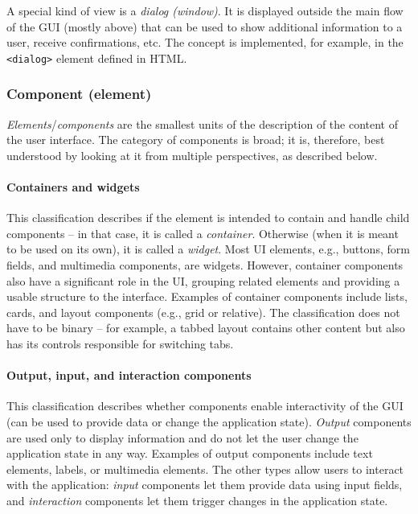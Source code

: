 A special kind of view is a \emph{dialog (window)}.
It is displayed outside the main flow of the GUI (mostly above) that can be used to show additional information to a user, receive confirmations, etc.
The concept is implemented, for example, in the \texttt{<dialog>} element defined in HTML.

\subsubsection{Component (element)}
\emph{Elements}/\emph{components} are the smallest units of the description of the content of the user interface.
The category of components is broad;
it is, therefore, best understood by looking at it from multiple perspectives, as described below.

\paragraph{Containers and widgets}
This classification describes if the element is intended to contain and handle child components -- in that case, it is called a \emph{container}.
Otherwise (when it is meant to be used on its own), it is called a \emph{widget}.
Most UI elements, e.g., buttons, form fields, and multimedia components, are widgets.
However, container components also have a significant role in the UI, grouping related elements and providing a usable structure to the interface.
Examples of container components include lists, cards, and layout components (e.g., grid or relative).
The classification does not have to be binary -- for example, a tabbed layout contains other content but also has its controls responsible for switching tabs.

\paragraph{Output, input, and interaction components}
This classification describes whether components enable interactivity of the GUI (can be used to provide data or change the application state).
\emph{Output} components are used only to display information and do not let the user change the application state in any way.
Examples of output components include text elements, labels, or multimedia elements.
The other types allow users to interact with the application: \emph{input} components let them provide data using input fields, and \emph{interaction} components let them trigger changes in the application state.

